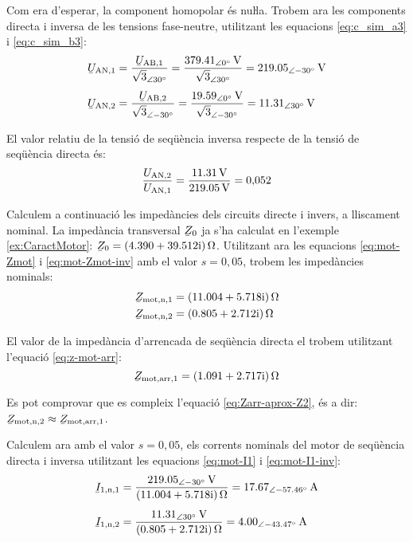 \begin{exemple}
	Com era d'esperar, la component homopolar és nuŀla.	 Trobem ara les components directa i inversa
	de les tensions fase-neutre, utilitzant les equacions
	\eqref{eq:c_sim_a3} i \eqref{eq:c_sim_b3}:
	\begin{align*}
	\cmplx{U}\ped{AN,1} &=
	\frac{\cmplx{U}\ped{AB,1}}{\sqrt{3}_{\angle\ang{30}}} =
	\frac{\qtypd{379,41}{0}{V}}{\sqrt{3}_{\angle\ang{30}}} =
	\qtypd{219,05}{-30}{V} \\[1ex]
	\cmplx{U}\ped{AN,2} &=
	\frac{\cmplx{U}\ped{AB,2}}{\sqrt{3}_{\angle\ang{-30}}} =
	\frac{\qtypd{19,59}{0}{V}}{\sqrt{3}_{\angle\ang{-30}}} =
	\qtypd{11,31}{30}{V} 
	\end{align*}
	
	El valor relatiu de la tensió de seqüència inversa respecte de la tensió de seqüència directa és:
	\[
		\frac{U_\mathrm{AN,2}}{U_\mathrm{AN,1}} = \frac{\qty{11,31}{V}}{\qty{219,05}{V}} = 0{,}052
	\]
	
	Calculem a continuació les impedàncies dels circuits directe i invers, a lliscament nominal. La impedància transversal $\cmplx{Z}_0$ ja s'ha calculat en l'exemple \ref{ex:CaractMotor}: $ \cmplx{Z}_0 =  \complexqty{4,390+j39,512}{\ohm} $. Utilitzant ara les equacions \eqref{eq:mot-Zmot} i \eqref{eq:mot-Zmot-inv} amb el valor $s=0{,}05$, trobem les impedàncies nominals:
	\begin{align*}
		\cmplx{Z}\ped{mot,n,1} &= \complexqty{11,004+j5,718}{\ohm} \\
		\cmplx{Z}\ped{mot,n,2} &= \complexqty{0,805+j2,712}{\ohm}
	\end{align*}
	
	El valor de la impedància d'arrencada de seqüència directa el trobem utilitzant l'equació \eqref{eq:z-mot-arr}:
	\[
		\cmplx{Z}\ped{mot,arr,1} = \complexqty{1,091+j2,717}{\ohm}
	\]
	
	Es pot comprovar que es compleix l'equació \eqref{eq:Zarr-aprox-Z2}, és a dir: $\cmplx{Z}\ped{mot,n,2} \approx \cmplx{Z}\ped{mot,arr,1}$.
	
	Calculem ara amb el valor $s=0{,}05$, els corrents nominals del motor de seqüència directa i inversa utilitzant les equacions \eqref{eq:mot-I1} i \eqref{eq:mot-I1-inv}:
	\begin{align*}
		\cmplx{I}\ped{1,n,1} &=  \frac{\qtypd{219,05}{-30}{V}}{\complexqty{11,004+j5,718}{\ohm}} = \qtypd{17,67}{-57,46}{A} \\[1ex] 
		\cmplx{I}\ped{1,n,2} &= \frac{\qtypd{11,31}{30}{V}}{\complexqty{0,805+j2,712}{\ohm}} = \qtypd{4,00}{-43,47}{A}
	\end{align*}
	

\end{exemple}
